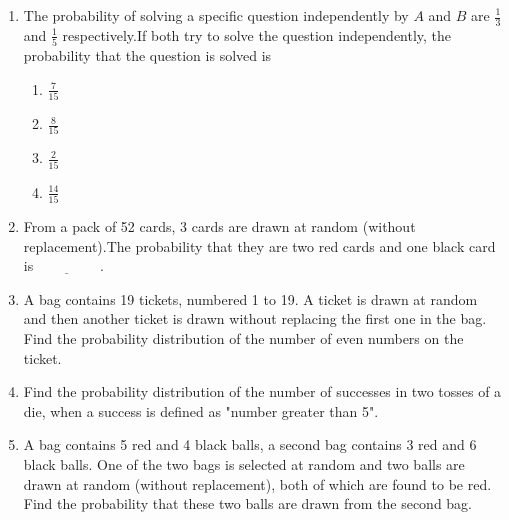 \begin{enumerate}
    \item The probability of solving a specific question independently by $A$ and $B$ are $\frac{1}{3}$ and $\frac{1}{5}$ respectively.If both try to solve the question independently, the probability that the question is solved is
    \begin{enumerate}
        \item $\frac{7}{15}$
        \item $\frac{8}{15}$
        \item $\frac{2}{15}$
        \item $\frac{14}{15}$
    \end{enumerate}
   
    \item From a pack of 52 cards, 3 cards are drawn at random (without replacement).The probability that they are two red cards and one black card is$\underline{\hspace{2cm}}$.
    \item A bag contains 19 tickets, numbered 1 to 19. A ticket is drawn at random and then another ticket is drawn without replacing the first one in the bag. Find the probability distribution of the number of even numbers on the ticket.
   
    \item Find the probability distribution of the number of successes in two tosses of a die, when a success is defined as "number greater than 5".
    \item A bag contains 5 red and 4 black balls, a second bag contains 3 red and 6 black balls. One of the two bags is selected at random and two balls are drawn at random (without replacement), both of which are found to be red. Find the probability that these two balls are drawn from the second bag.
   

\end{enumerate}
